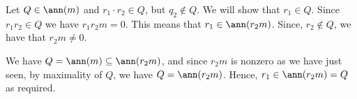 Let $Q \in \ann(m)$ and $r_1\cdot r_2 \in Q$, but $q_2\notin Q$. We will show
that $r_1 \in Q$. Since $r_1r_2 \in Q$ we have $r_1r_2m = 0$. This means that
$r_1 \in \ann(r_2 m)$. Since, $r_2\notin Q$, we have that $r_2m\neq 0$.

We have $Q = \ann(m) \subseteq \ann(r_2m)$, and since $r_2m$ is nonzero as we have
just seen, by maximality of $Q$, we have $Q = \ann(r_2m)$. Hence,
$r_1 \in \ann(r_2m) = Q$ as required.
